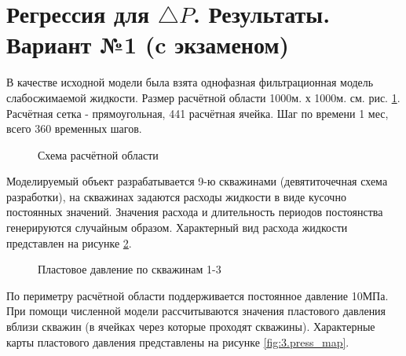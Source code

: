\documentclass[14pt]{article}
\begin{document}
	\section{Регрессия для $\triangle P$. Результаты. Вариант №1 (c экзаменом)}
	В качестве исходной модели была взята однофазная фильтрационная модель слабосжимаемой жидкости. Размер расчётной области 1000м. х 1000м. см. рис. \ref{fig:map9}. Расчётная сетка - прямоугольная, 441 расчётная ячейка. Шаг по времени 1 мес, всего 360 временных шагов.
		\begin{figure}
		\caption{Схема расчётной области}
		\label{fig:map9}
	\end{figure}
	Моделируемый объект разрабатывается 9-ю скважинами (девятиточечная схема разработки), на скважинах задаются расходы жидкости в виде кусочно постоянных значений. Значения расхода и длительность периодов постоянства генерируются случайным образом. Характерный вид расхода жидкости представлен на рисунке \ref{fig:3.qw_1_9}.
	\begin{figure}[h]
		\caption{Пластовое давление по скважинам 1-3}
		\label{fig:3.qw_1_9}
	\end{figure}
	По периметру расчётной области поддерживается постоянное давление 10МПа. При помощи численной модели рассчитываются значения пластового давления вблизи скважин (в ячейках через которые проходят скважины). Характерные карты пластового давления представлены на рисунке \ref{fig:3.press_map}.
	
\end{document}
